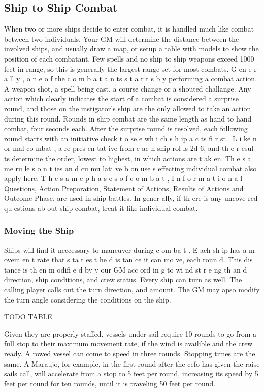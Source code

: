 \begin{multicols*}{2}
\subsection{Ship to Ship Combat}
When two or more ships decide to enter combat, it
is handled much like combat between two individuals. Your
GM will determine the distance between the involved ships,
and usually draw a map, or setup a table with models to show
the position of each combatant. Few spells and no ship to ship
weapons exceed 1000 feet in range, so this is generally the
largest range set for most combats.
G en e r a ll y , o n e o f the c o m b a t a n ts s t a r t s b y
performing a combat action. A weapon shot, a spell being
cast, a course change or a shouted challange. Any action
which clearly indicates the start of a combat is considered a
surprise round, and those on the instigator’s ship are the
only allowed to take an action during this round.
Rounds in ship combat are the same length as hand
to hand combat, four seconds each. After the surprise round is
resolved, each following round starts with an initiative check
t o se e wh i ch s h ip a c ts fi r st . L i ke n or mal co mbat , a
re pres en tat ive from e ac h ship rol ls 2d 6, and th e r esul ts
determine the order, lowest to highest, in which actions are
t ak en. Th e s a me ru le s o n t ies an d cu mu lati ve b on use s
effecting individual combat also apply here.
T h e s a m e p h a s e s o f c o m b a t , I n f o r m a t i o n a l
Questions, Action Preporation, Statement of Actions, Results
of Actions and Outcome Phase, are used in ship battles. In
gener ally, if th ere is any uncove red qu estions ab out ship
combat, treat it like individual combat.
\subsubsection{Moving the Ship}
Ships will find it neccessary to maneuver during
c om ba t . E ach sh ip has a m ovem en t rate that s ta t es t he
d is tan ce it can mo ve, each roun d. This dis tance is th en
m odifi e d by y our GM acc ord in g to wi nd st r e ng th an d
direction, ship conditions, and crew status.
Every ship can turn as well. The calling player calls
out the turn direction, and amount. The GM may apso modify
the turn angle considering the conditions on the ship.

TODO TABLE

Given they are properly staffed, vessels under sail
require 10 rounds to go from a full stop to their maximum
movement rate, if the wind is availible and the crew ready. A
rowed vessel can come to speed in three rounds. Stopping
times are the same. A Maraujo, for example, in the first round
after the cefo has given the raise sails call, will accelerate
from a stop to 5 feet per round, increasing its speed by 5 feet
per round for ten rounds, until it is traveling 50 feet per
round.

\end{multicols*}
